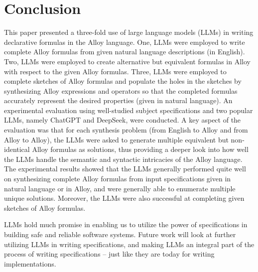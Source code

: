 \section{Conclusion}
\label{sec:conclusion}

This paper presented a three-fold use of large language models (LLMs)
in writing declarative formulas in the Alloy language.  One, LLMs were
employed to write complete Alloy formulas from given natural language
descriptions (in English).  Two, LLMs were employed to create
alternative but equivalent formulas in Alloy with respect to the given
Alloy formulas.  Three, LLMs were employed to complete sketches of
Alloy formulas and populate the holes in the sketches by synthesizing
Alloy expressions and operators so that the completed formulas
accurately represent the desired properties (given in natural
language).  An experimental evaluation using \NumSubjects{}
well-studied subject specifications and two popular LLMs, namely
ChatGPT and DeepSeek, were conducted.  A key aspect of the evaluation
was that for each synthesis problem (from English to Alloy and from
Alloy to Alloy), the LLMs were asked to generate multiple equivalent
but non-identical Alloy formulas as solutions, thus providing a deeper
look into how well the LLMs handle the semantic and syntactic
intricacies of the Alloy language.  The experimental results showed
that the LLMs generally performed quite well on synthesizing complete
Alloy formulas from input specifications given in natural language or
in Alloy, and were generally able to enumerate multiple unique
solutions.  Moreover, the LLMs were also successful at completing
given sketches of Alloy formulas.

LLMs hold much promise in enabling us to utilize the power of
specifications in building safe and reliable software systems.  Future
work will look at further utilizing LLMs in writing specifications,
and making LLMs an integral part of the process of writing
specifications -- just like they are today for writing
implementations.

